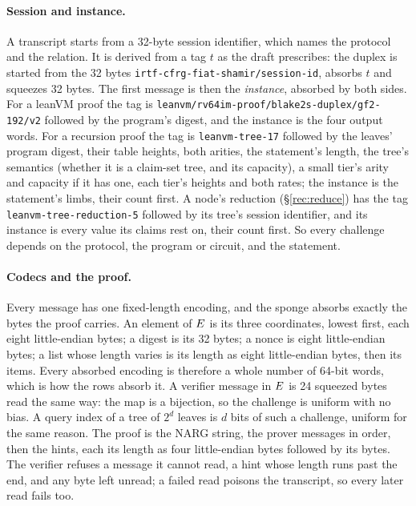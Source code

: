 \paragraph{Session and instance.} A transcript starts from a 32-byte session identifier, which names the protocol and the relation. It is derived from a tag $t$ as the draft prescribes: the duplex is started from the 32 bytes \texttt{irtf-cfrg-fiat-shamir/session-id}, absorbs $t$ and squeezes 32 bytes. The first message is then the \emph{instance}, absorbed by both sides. For a leanVM proof the tag is \texttt{leanvm/rv64im-proof/blake2s-duplex/gf2-192/v2} followed by the program's digest, and the instance is the four output words. For a recursion proof the tag is \texttt{leanvm-tree-17} followed by the leaves' program digest, their table heights, both arities, the statement's length, the tree's semantics (whether it is a claim-set tree, and its capacity), a small tier's arity and capacity if it has one, each tier's heights and both rates; the instance is the statement's limbs, their count first. A node's reduction (\S\ref{rec:reduce}) has the tag \texttt{leanvm-tree-reduction-5} followed by its tree's session identifier, and its instance is every value its claims rest on, their count first. So every challenge depends on the protocol, the program or circuit, and the statement.

\paragraph{Codecs and the proof.} Every message has one fixed-length encoding, and the sponge absorbs exactly the bytes the proof carries. An element of $E$ is its three coordinates, lowest first, each eight little-endian bytes; a digest is its 32 bytes; a nonce is eight little-endian bytes; a list whose length varies is its length as eight little-endian bytes, then its items. Every absorbed encoding is therefore a whole number of 64-bit words, which is how the rows absorb it. A verifier message in $E$ is 24 squeezed bytes read the same way: the map is a bijection, so the challenge is uniform with no bias. A query index of a tree of $2^d$ leaves is $d$ bits of such a challenge, uniform for the same reason. The proof is the NARG string, the prover messages in order, then the hints, each its length as four little-endian bytes followed by its bytes. The verifier refuses a message it cannot read, a hint whose length runs past the end, and any byte left unread; a failed read poisons the transcript, so every later read fails too.

